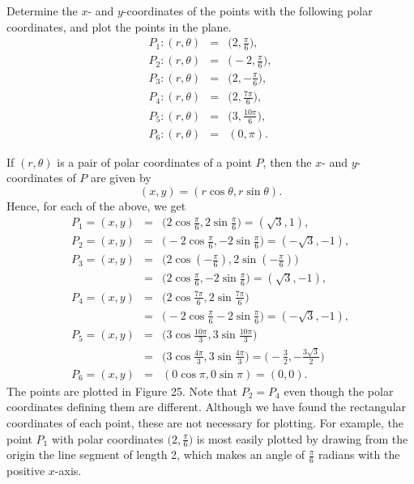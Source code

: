 \begin{example} Determine the $x$- and $y$-coordinates of the points with the following polar coordinates, and plot the points in the plane.
\begin{eqnarray*}
P_1: (r, \theta) &=& \Big( 2, \frac{\pi}{6}  \Big),\\
P_2: (r, \theta) &=& \Big( -2, \frac{\pi}{6} \Big),\\
P_3: (r, \theta) &=& \Big( 2, -\frac{\pi}{6} \Big),\\
P_4: (r, \theta) &=& \Big( 2, \frac{7\pi}{6} \Big),\\
P_5: (r, \theta) &=& \Big( 3, \frac{10\pi}{6} \Big),\\
P_6: (r, \theta) &=& ( 0, \pi ).
\end{eqnarray*}

\noindent If $(r, \theta)$ is a pair of polar coordinates of a point $P$, then the $x$- and $y$-coordinates of $P$ are given by
$$
(x, y) = (r \cos \theta, r \sin \theta).
$$
\noindent Hence, for each of the above, we get 
\begin{eqnarray*}
P_1 = (x, y) &=&  \Big(2 \cos \frac{\pi}{6},  2 \sin \frac{\pi}{6}  \Big) = (\sqrt 3, 1), \\
P_2 = (x, y) &=&  \Big(-2 \cos \frac{\pi}{6}, -2\sin \frac{\pi}{6}  \Big)= ( -\sqrt 3, - 1), \\
P_3 = (x, y) &=&  \Big(2 \cos (-\frac{\pi}{6}), 2 \sin (-\frac{\pi}{6})  \Big) \\
&=&  \Big(2 \cos \frac{\pi}{6}, -2 \sin \frac{\pi}{6}  \Big) = (\sqrt 3, -1), \\
P_4 =  (x, y) &=&  \Big(2 \cos \frac{7\pi}{6}, 2 \sin \frac{7\pi}{6}  \Big) \\
&=&  \Big(-2 \cos \frac{\pi}{6} -2\sin \frac{\pi}{6}  \Big)= (-\sqrt 3, -1), \\
P_5 = (x, y) &=&  \Big(3 \cos  \frac{10\pi}{3}, 3 \sin \frac{10\pi}{3}  \Big)\\
&=&  \Big(3 \cos \frac{4\pi}{3}, 3 \sin\frac{4\pi}{3}  \Big) =  \Big(-\frac{3}{2}, -\frac{3\sqrt3}{2}  \Big) \\
P_6 = (x, y) &=& (0 \cos \pi, 0 \sin \pi) = (0, 0).
\end{eqnarray*}
\noindent The points are plotted in Figure 25. Note that $P_2 = P_4$ even though the polar coordinates defining them are different. Although we have found the rectangular coordinates of each point, these are not necessary for plotting. For example, the point $P_1$ with polar coordinates $ \Big(2, \frac{\pi}{6} \Big)$ is most easily plotted by drawing from the origin the line segment of length 2, which makes an angle of $\frac{\pi}{6}$ radians with the positive $x$-axis.  


\end{example}
